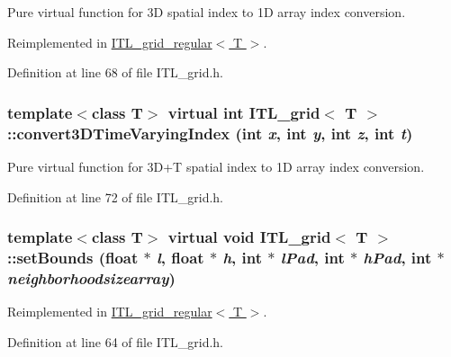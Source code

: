 Pure virtual function for 3D spatial index to 1D array index conversion. 



Reimplemented in \hyperlink{classITL__grid__regular_a9561a0c36a74216eef9685d5f3369f7a}{ITL\_\-grid\_\-regular$<$ T $>$}.



Definition at line 68 of file ITL\_\-grid.h.

\hypertarget{classITL__grid_ab43a701a19db72eafd919763f9092a74}{
\subsubsection[{convert3DTimeVaryingIndex}]{\setlength{\rightskip}{0pt plus 5cm}template$<$class T$>$ virtual int {\bf ITL\_\-grid}$<$ T $>$::convert3DTimeVaryingIndex (int {\em x}, \/  int {\em y}, \/  int {\em z}, \/  int {\em t})}}
\label{classITL__grid_ab43a701a19db72eafd919763f9092a74}


Pure virtual function for 3D+T spatial index to 1D array index conversion. 



Definition at line 72 of file ITL\_\-grid.h.

\hypertarget{classITL__grid_aacc7102ddeec002827256c267b7eac38}{
\subsubsection[{setBounds}]{\setlength{\rightskip}{0pt plus 5cm}template$<$class T$>$ virtual void {\bf ITL\_\-grid}$<$ T $>$::setBounds (float $\ast$ {\em l}, \/  float $\ast$ {\em h}, \/  int $\ast$ {\em lPad}, \/  int $\ast$ {\em hPad}, \/  int $\ast$ {\em neighborhoodsizearray})}}
\label{classITL__grid_aacc7102ddeec002827256c267b7eac38}


Reimplemented in \hyperlink{classITL__grid__regular_a324d135ffc7a8e3dab70933f036c7e5a}{ITL\_\-grid\_\-regular$<$ T $>$}.



Definition at line 64 of file ITL\_\-grid.h.

